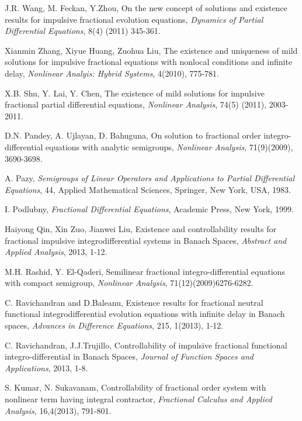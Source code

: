 \documentclass[11pt]{article}
\begin{document}
\begin{thebibliography}{USA00}
 J.R. Wang, M. Feckan, Y.Zhou, On the new concept of solutions and existence results for impulsive fractional evolution equations, {\it Dynamics of Partial Differential Equations}, 8(4) (2011) 345-361.



 Xianmin Zhang, Xiyue Huang, Zuohua Liu, The existence and uniqueness of mild solutions for impulsive fractional equations with nonlocal conditions and infinite delay, {\it Nonlinear Analyis: Hybrid Systems}, 4(2010), 775-781.



 X.B. Shu, Y. Lai, Y. Chen, The existence of mild solutions for impulsive fractional partial differential equations, {\it Nonlinear Analysis}, 74(5) (2011), 2003-2011.

\end{thebibliography}


 D.N. Pandey, A. Ujlayan, D. Bahuguna, On solution to fractional order integro-differential equations with analytic semigroups, {\it Nonlinear Analysis}, 71(9)(2009), 3690-3698.

 A. Pazy, {\it Semigroups of Linear Operators and Applications to Partial Differential Equations}, 44, Applied Mathematical Sciences, Springer, New York, USA, 1983.

 I. Podlubny, {\it Fractional Differential Equations}, Academic Press, New York, 1999.

Haiyong Qin, Xin Zuo, Jianwei Liu, Existence and controllability results for fractional impulsive integrodifferential systems in Banach Spaces, {\it Abstract and Applied Analysis}, 2013, 1-12.

M.H. Rashid, Y. El-Qaderi, Semilinear fractional integro-differential equations with compact semigroup, {\it Nonlinear Analysis}, 71(12)(2009)6276-6282.

C. Ravichandran and D.Baleanu, Existence results for fractional neutral functional integrodifferential evolution equations with infinite delay in Banach spaces, {\it Advances in Difference Equations}, 215, 1(2013), 1-12.

 C. Ravichandran, J.J.Trujillo, Controllability of impulsive fractional functional integro-differential in Banach Spaces, {\it Journal of Function Spaces and Applications}, 2013, 1-8.



 S. Kumar, N. Sukavanam, Controllability of fractional order system with nonlinear term having integral contractor, {\it Fractional Calculus and Applied Analysis}, 16,4(2013), 791-801.
\end{document}
